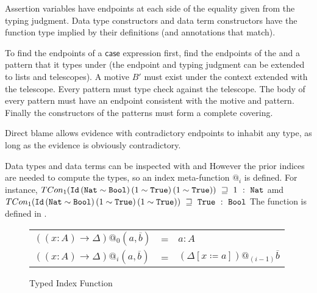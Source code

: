 
Assertion variables have endpoints at each side of the equality given from the typing judgment.
Data type constructors and data term constructors have the function type implied by their definitions (and annotations that match).

To find the endpoints of a $\mathsf{case}$ expression first, find the endpoints of the \scruts{} and a pattern that it types under (the endpoint and typing judgment can be extended to lists and telescopes).
A motive $B'$ must exist under the context extended with the telescope.
Every pattern must type check against the telescope.
The body of every pattern must have an endpoint consistent with the motive and pattern.
Finally the constructors of the patterns must form a complete covering.
  
Direct blame allows evidence with contradictory endpoints to inhabit any type, as long as the evidence is obviously contradictory.

Data types and data terms can be inspected with  and 
However the prior indices are needed to compute the types, so an index meta-function $@_{i}$ is defined.
For instance, $TCon_1 (\Id{}\, (\Nat{}\sim\Bool{})\,(1\sim\True{})\,(1\sim\True{}))\ \sqsupseteq\  1\ :\ \Nat{}$ amd $TCon_1 (\Id{}\, (\Nat{}\sim\Bool{})\,(1\sim\True{})\,(1\sim\True{}))\ \sqsupseteq\  \True{}\ :\ \Bool{}$
The function is defined in .

\begin{figure}

\begin{tabular}{lll}
  $\left(\left(x:A\right)\rightarrow\Delta\right)@_{0}\left(a,\overline{b}\right)$ & = & $a:A$\tabularnewline
  $\left(\left(x:A\right)\rightarrow\Delta\right)@_{i}\left(a,\overline{b}\right)$ & = & $\left(\Delta\left[x\coloneqq a\right]\right)@_{\left(i-1\right)}\overline{b}$\tabularnewline
\end{tabular}
\caption{Typed Index Function}
\label{fig:cast-Data-index-1}
\end{figure}